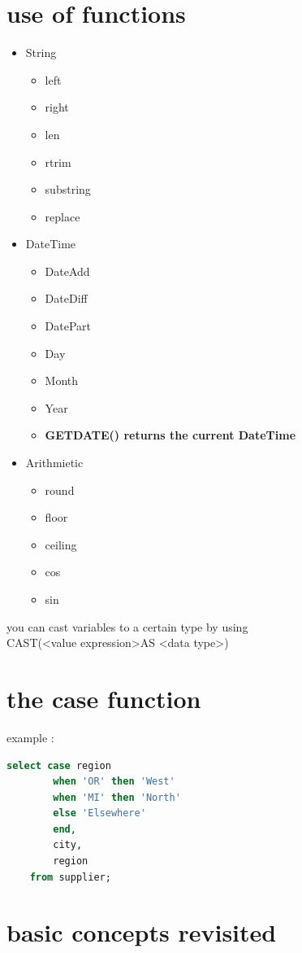 \documentclass{report}
\begin{document}
	\section{use of functions}
	\begin{itemize}
		\item String
		\begin{itemize}
			\item left
			\item right
			\item len
			\item rtrim
			\item substring
			\item replace
		\end{itemize}
		\item DateTime
		\begin{itemize}
			\item DateAdd
			\item DateDiff
			\item DatePart
			\item Day
			\item Month
			\item Year
			\item \textbf{GETDATE() returns the current DateTime}
		\end{itemize}
		\item Arithmietic
		\begin{itemize}
			\item round
			\item floor
			\item ceiling
			\item cos
			\item sin
		\end{itemize}
	\end{itemize}
	you can cast variables to a certain type by using \\ CAST(\textless value expression\textgreater AS \textless data type\textgreater)
	\section{the case function}
	example : 
	\begin{lstlisting}[language=SQL]
	select case region 
		when 'OR' then 'West' 
		when 'MI' then 'North' 
		else 'Elsewhere' 
		end,
		city,
		region
	from supplier;\end{lstlisting}
	\pagebreak
	\section{basic concepts revisited}
\end{document}
